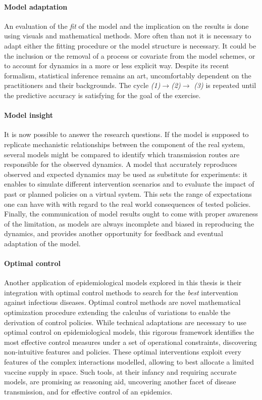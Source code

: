 \paragraph{Model adaptation} An evaluation of the \textit{fit} of the model and the implication on the results is done using visuals and mathematical methods. More often than not it is necessary to adapt either the fitting procedure or the model structure is necessary. It could be the inclusion or the removal of a process or covariate from the model schemes, or to account for dynamics in a more or less explicit way.  Despite its recent formalism, statistical inference remains an art, uncomfortably dependent on the practitioners and their backgrounds. The cycle \textit{(1)}$\rightarrow$\textit{(2)}$\rightarrow$ \textit{(3)} is repeated until the predictive accuracy is satisfying for the goal of the exercise. 

\paragraph{Model insight}  It is now possible to answer the research questions. If the model is supposed to replicate mechanistic relationships between the component of the real system, several models might be compared to identify which transmission routes are responsible for the observed dynamics. A model that accurately reproduces observed and expected dynamics may be used as substitute for experiments: it enables to simulate different intervention scenarios and to evaluate the impact of past or planned policies on a virtual system. This sets the range of expectations one can have with with regard to the real world consequences of tested policies. Finally, the communication of model results ought to come with proper awareness of the limitation, as models are always incomplete and biased in reproducing the dynamics, and provides another opportunity for feedback and eventual adaptation of the model\cite{Heesterbeek:ModelingInfectiousDisease:2015}. 

\paragraph{Optimal control} Another application of epidemiological models explored in this thesis is their integration with optimal control methods to search for the \textit{best} intervention against infectious diseases. Optimal control methods are novel mathematical optimization procedure extending the calculus of variations to enable the derivation of control policies. While technical adaptations are necessary to use optimal control on epidemiological models, this rigorous framework identifies the most effective control measures under a set of operational constraints, discovering non-intuitive features and policies. These optimal interventions exploit every features of the complex interactions modelled, allowing to \eg best allocate a limited vaccine supply in space. Such tools, at their infancy and requiring accurate models, are promising as reasoning aid, uncovering another facet of disease transmission, and for effective control of an epidemics.



